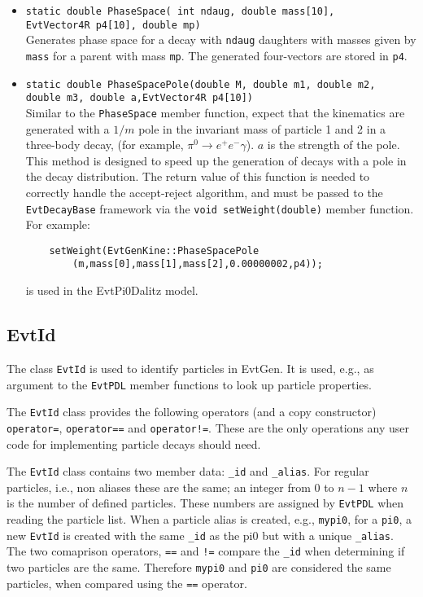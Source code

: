\begin{itemize}
\item {\tt static double PhaseSpace( int ndaug, double mass[10],}\\
      {\tt EvtVector4R p4[10], double mp)}\\
      Generates phase space for a decay with {\tt ndaug} daughters
      with masses given by {\tt mass} for a parent with mass {\tt mp}.
      The generated four-vectors are stored in {\tt p4}.
\item {\tt static double PhaseSpacePole(double M, double m1, double m2,}\\
      {\tt double m3, double a,EvtVector4R p4[10])}\\
      Similar to the {\tt PhaseSpace} member function, expect that
      the kinematics are generated with a $1/m$ pole in the 
      invariant mass of particle 1 and 2 in a three-body decay, 
      (for example, $\pi^0\rightarrow e^+e^-\gamma$). $a$ is the 
      strength of the pole.  This method is designed to speed up
      the generation of decays with a pole in the decay distribution.
      The return value of this function is
      needed to correctly handle the accept-reject algorithm, and 
      must be passed to the {\tt EvtDecayBase} framework via the
      {\tt void setWeight(double)} member function.  For example:
\begin{verbatim}
    setWeight(EvtGenKine::PhaseSpacePole
  	    (m,mass[0],mass[1],mass[2],0.00000002,p4));
\end{verbatim}
is used in the EvtPi0Dalitz model.

\end{itemize}

\subsection{EvtId}

The class {\tt EvtId} is used to identify particles in EvtGen. It 
is used, e.g.,
as argument to the {\tt EvtPDL} member functions to look up
particle properties.

The {\tt EvtId} class provides the following operators (and a copy
constructor) {\tt operator=}, {\tt operator==} and {\tt operator!=}.
These are the only operations any user code for implementing
particle decays should need. 

The {\tt EvtId} class contains two member data: {\tt \_id} and
{\tt \_alias}. For regular particles, i.e., non aliases these
are the same; an integer from $0$ to $n-1$ where $n$ is the 
number of defined particles. These numbers are assigned by {\tt EvtPDL}
when reading the particle list. When a particle alias is
created, e.g., {\tt mypi0}, for a {\tt pi0}, a new {\tt EvtId} is created
with the same {\tt \_id} as the pi0 but with a unique
{\tt \_alias}. The two comaprison operators, {\tt ==}
and {\tt !=} compare the {\tt \_id} when determining if two
particles are the same. Therefore {\tt mypi0} and {\tt pi0} are 
considered the same particles, when compared using the {\tt ==} 
operator.

